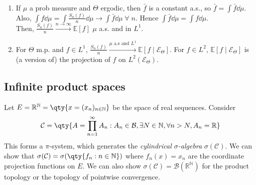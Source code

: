 \begin{remark} \label{rem:ergodic} \
	\begin{enumerate}
		\item If $\mu$ a prob measure and $\Theta$ ergodic, then $\bar f$ is a constant a.s., so $\bar f = \int \bar f \dd{\mu}$.
		Also, $\int f \dd{\mu} = \int \frac{S_n(f)}{n} \dd{\mu} \to \int \bar f \dd{\mu} \; \forall \; n$.
		Hence $\int \bar f \dd{\mu} = \int f \dd{\mu}$. \\
		Then, $\frac{S_n(f)}{n} \xrightarrow{n \to \infty} \mathbb{E}[f]$ $\mu$ a.s. and in $L^1$.
		\item For $\Theta$ m.p. and $f \in L^1$, $\frac{S_n(f)}{n} \xrightarrow{\mu \text{ a.s and } L^1} \mathbb{E}[f \mid \mathcal{E}_\Theta]$.
		For $f \in L^2$, $\mathbb{E}[f \mid \mathcal{E}_\Theta]$ is (a version of) the projection of $f$ on $L^2(\mathcal{E}_\Theta)$.
	\end{enumerate}
\end{remark}

\subsection{Infinite product spaces}
Let $E = \mathbb R^{\mathbb N} = \qty{x = (x_n)_{n \in \mathbb N}}$ be the space of real sequences.
Consider
\begin{align*}
        \mathcal C = \qty{A = \prod_{n=1}^\infty A_n : A_n \in \mathcal B, \exists N \in \mathbb N, \forall n > N, A_n = \mathbb R}
    \end{align*}
This forms a $\pi$-system, which generates the \emph{cylindrical $\sigma$-algebra} $\sigma(\mathcal C)$.
We can show that $\sigma(\mathcal C) = \sigma(\qty{f_n : n \in \mathbb N})$ where $f_n(x) = x_n$ are the coordinate projection functions on $E$.
We can also show $\sigma(\mathcal C) = \mathcal B(\mathbb R^{\mathbb N})$ for the product topology or the topology of pointwise convergence.

